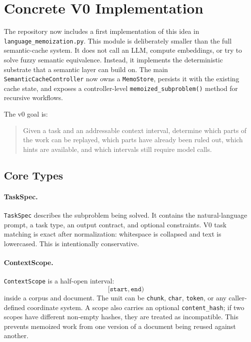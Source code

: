 \documentclass[11pt]{article}
\begin{document}
\section{Concrete V0 Implementation}

The repository now includes a first implementation of this idea in
\texttt{language\_memoization.py}. This module is deliberately smaller than the
full semantic-cache system. It does not call an LLM, compute embeddings, or try
to solve fuzzy semantic equivalence. Instead, it implements the deterministic
substrate that a semantic layer can build on. The main
\texttt{SemanticCacheController} now owns a \texttt{MemoStore}, persists it with
the existing cache state, and exposes a controller-level
\texttt{memoized\_subproblem()} method for recursive workflows.

The v0 goal is:

\begin{quote}
Given a task and an addressable context interval, determine which parts of the
work can be replayed, which parts have already been ruled out, which hints are
available, and which intervals still require model calls.
\end{quote}

\subsection{Core Types}

\paragraph{TaskSpec.}
\texttt{TaskSpec} describes the subproblem being solved. It contains the
natural-language prompt, a task type, an output contract, and optional
constraints. V0 task matching is exact after normalization: whitespace is
collapsed and text is lowercased. This is intentionally conservative.

\paragraph{ContextScope.}
\texttt{ContextScope} is a half-open interval:
\[
    [\texttt{start}, \texttt{end})
\]
inside a corpus and document. The unit can be \texttt{chunk}, \texttt{char},
\texttt{token}, or any caller-defined coordinate system. A scope also carries
an optional \texttt{content\_hash}; if two scopes have different non-empty
hashes, they are treated as incompatible. This prevents memoized work from one
version of a document being reused against another.
\end{document}
